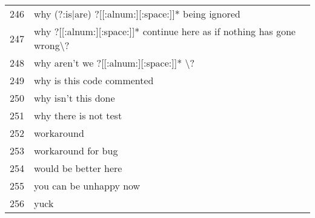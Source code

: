 \begin{longtable}{r|l}
246 & why (?:is|are) ?[[:alnum:][:space:]]* being ignored\\
247 & why ?[[:alnum:][:space:]]* continue here as if nothing has gone wrong\textbackslash{}?\\
248 & why aren't we ?[[:alnum:][:space:]]* \textbackslash{}?\\
249 & why is this code commented\\
250 & why isn't this done\\
251 & why there is not test\\
252 & workaround\\
253 & workaround for bug\\
254 & would be better here\\
255 & you can be unhappy now\\
256 & yuck\\
\hline
\end{longtable}


